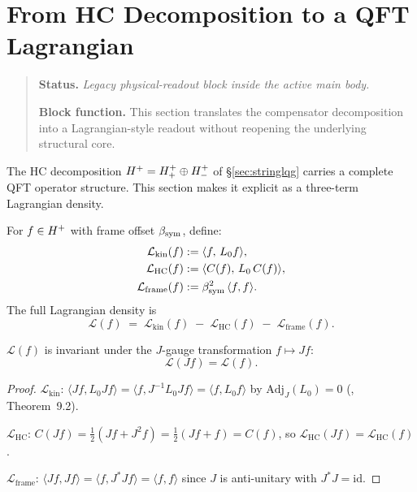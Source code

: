 \section{From HC Decomposition to a QFT Lagrangian}
\begin{quote}\small
\noindent\textbf{Status.} \emph{Legacy physical-readout block inside the active main body.}\par
\noindent\textbf{Block function.} This section translates the compensator decomposition into a Lagrangian-style readout without reopening the underlying structural core.
\end{quote}
\label{sec:lagrangian}

\begin{remark}
The HC decomposition $H^+=H^+_+\oplus H^+_-$ of \S\ref{sec:stringlqg}
carries a complete QFT operator structure.
This section makes it explicit as a three-term Lagrangian density.
\end{remark}

\begin{definition}\label{def:lagrangian}
For $f\in H^+$ with frame offset $\beta_{\mathrm{sym}}$, define:
\begin{align}
  \mathcal{L}_{\mathrm{kin}}(f)
    &:= \langle f,\,L_0 f\rangle,\label{eq:L_kin}\\
  \mathcal{L}_{\mathrm{HC}}(f)
    &:= \langle C(f),\,L_0\,C(f)\rangle,\label{eq:L_HC}\\
  \mathcal{L}_{\mathrm{frame}}(f)
    &:= \beta_{\mathrm{sym}}^2\,\langle f,f\rangle.\label{eq:L_frame}
\end{align}
The full Lagrangian density is
\[
  \mathcal{L}(f)
  \;=\;
  \mathcal{L}_{\mathrm{kin}}(f)
  \;-\;
  \mathcal{L}_{\mathrm{HC}}(f)
  \;-\;
  \mathcal{L}_{\mathrm{frame}}(f).
\]
\end{definition}

\begin{theorem}\label{thm:gauge-invariance}
$\mathcal{L}(f)$ is invariant under the $J$-gauge transformation
$f\mapsto Jf$:
\[
  \mathcal{L}(Jf) = \mathcal{L}(f).
\]
\end{theorem}

\begin{proof}
$\mathcal{L}_{\mathrm{kin}}$:
$\langle Jf,L_0 Jf\rangle = \langle f,J^{-1}L_0 Jf\rangle
= \langle f,L_0 f\rangle$
by $\mathrm{Adj}_J(L_0)=0$ (\cite{brendecke2026rh}, Theorem~9.2).

$\mathcal{L}_{\mathrm{HC}}$:
$C(Jf)=\tfrac{1}{2}(Jf+J^2 f)=\tfrac{1}{2}(Jf+f)=C(f)$,
so $\mathcal{L}_{\mathrm{HC}}(Jf)=\mathcal{L}_{\mathrm{HC}}(f)$.

$\mathcal{L}_{\mathrm{frame}}$:
$\langle Jf,Jf\rangle=\langle f,J^*Jf\rangle=\langle f,f\rangle$
since $J$ is anti-unitary with $J^*J=\mathrm{id}$.
\end{proof}

